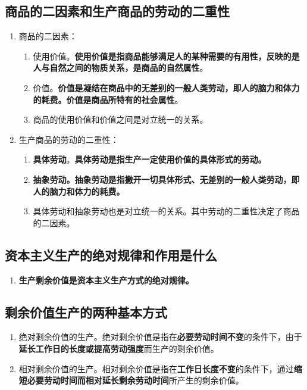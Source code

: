 \documentclass[12pt, a4paper, oneside]{ctexbook}
\begin{document}
\subsection{商品的二因素和生产商品的劳动的二重性}

\begin{enumerate}
\item 商品的二因素：
\begin{enumerate}
\item 使用价值。\textbf{使用价值是指商品能够满足人的某种需要的有用性，反映的是人与自然之间的物质关系，是商品的自然属性}。
\item 价值。\textbf{价值是凝结在商品中的无差别的一般人类劳动，即人的脑力和体力的耗费。价值是商品所特有的社会属性}。
\item 商品的使用价值和价值之间是对立统一的关系。
\end{enumerate}
\item 生产商品的劳动的二重性：
\begin{enumerate}
\item \textbf{具体劳动}。\textbf{具体劳动是指生产一定使用价值的具体形式的劳动。}
\item \textbf{抽象劳动。抽象劳动是指撇开一切具体形式、无差别的一般人类劳动，即人的脑力和体力的耗费。}
\item 具体劳动和抽象劳动也是对立统一的关系。其中劳动的二重性决定了商品的二因素。
\end{enumerate}
\end{enumerate}

\subsection{资本主义生产的绝对规律和作用是什么}

\begin{enumerate}
\item \textbf{生产剩余价值是资本主义生产方式的绝对规律。}
\end{enumerate}

\subsection{剩余价值生产的两种基本方式}

\begin{enumerate}
\item 绝对剩余价值的生产。绝对剩余价值是指在\textbf{必要劳动时间不变}的条件下，由于\textbf{延长工作日的长度或提高劳动强度}而生产的剩余价值。
\item 相对剩余价值的生产。相对剩余价值是指在\textbf{工作日长度不变}的条件下，通过\textbf{缩短必要劳动时间而相对延长剩余劳动时间}所产生的剩余价值。
\end{enumerate}
\end{document}
